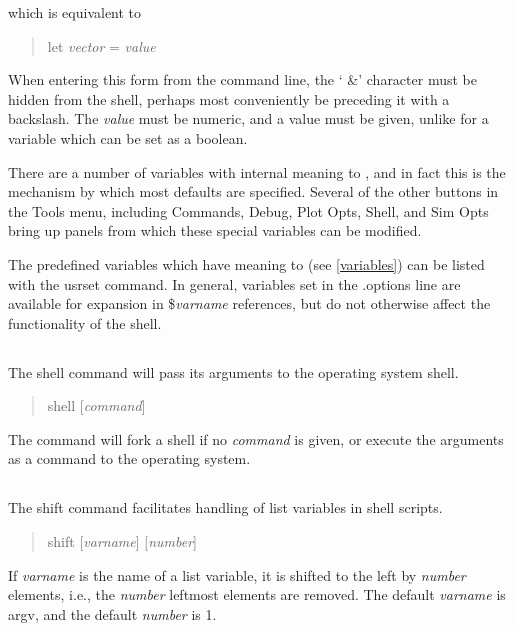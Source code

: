 which is equivalent to
 
\begin{quote}
{\vt let} {\it vector} {\vt =} {\it value}
\end{quote}
 
When entering this form from the {\WRspice} command line, the `{\vt
\&}' character must be hidden from the shell, perhaps most
conveniently be preceding it with a backslash.  The {\it value} must
be numeric, and a value must be given, unlike for a variable which can
be set as a boolean.

There are a number of variables with internal meaning to {\WRspice},
and in fact this is the mechanism by which most {\WRspice} defaults
are specified.  Several of the other buttons in the {\cb Tools} menu,
including {\cb Commands}, {\cb Debug}, {\cb Plot Opts}, {\cb Shell},
and {\cb Sim Opts} bring up panels from which these special variables
can be modified.

The predefined variables which have meaning to {\WRspice} (see
\ref{variables}) can be listed with the {\cb usrset} command.  In
general, variables set in the {\vt .options} line are available for
expansion in {\vt \$}{\it varname} references, but do not otherwise
affect the functionality of the shell.

\subsection{}


The {\cb shell} command will pass its arguments to the operating system
shell.
\begin{quote}\vt
shell [{\it command\/}]
\end{quote}
The command will fork a shell if no {\it command\/} is given, or
execute the arguments as a command to the operating system.

\subsection{}


The {\cb shift} command facilitates handling of list variables in
shell scripts.
\begin{quote}\vt
shift [{\it varname\/}] [{\it number\/}]
\end{quote}
If {\it varname} is the name of a list variable, it is shifted to
the left by {\it number} elements, i.e., the {\it number} leftmost
elements are removed. The default {\it varname} is {\vt argv}, and
the default {\it number} is 1.

